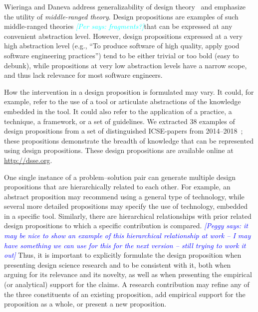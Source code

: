 \documentclass[graybox]{svmult}
\newcommand{\emelie}[1]{\textcolor{red}{{\it [Emelie says: #1]}}}
\newcommand{\peggy}[1]{\textcolor{blue}{{\it [Peggy says: #1]}}}
\newcommand{\per}[1]{\textcolor{cyan}{{\it [Per says: #1]}}}
\newcommand{\emelie}[1]{}
\newcommand{\peggy}[1]{}
\newcommand{\per}[1]{}
\begin{document}
Wieringa and Daneva address generalizability of design theory~\cite{wieringa_six_2015} and emphasize the utility of \emph{middle-ranged theory}. %
Design propositions are examples of such middle-ranged theories \per{fragments?}that can be expressed at any convenient abstraction level. However, design propositions expressed at a very high abstraction level (e.g., ``To produce software of high quality, apply good software engineering practices'') tend to be either trivial or too bold (easy to debunk), while propositions at very low abstraction levels have a narrow scope, and thus lack relevance for most software engineers. 

How the intervention in a design proposition is formulated may vary. It could, for example, refer to the use of a tool or articulate abstractions of the knowledge embedded in the tool. It could also refer to the application of a practice, a technique, a framework, or a set of guidelines. We extracted 38 examples of design propositions from a set of distinguished ICSE-papers from 2014--2018~\cite{Engstrom19arxiv}; these propositions demonstrate the breadth of knowledge that can be represented using design propositions. These design propositions are available online at \url{http://dsse.org}.

One single instance of a problem--solution pair can generate multiple design propositions that are hierarchically related to each other. For example, an abstract proposition may recommend using a general type of technology, while several more detailed propositions may specify the use of technology, embedded in a specific tool. Similarly, there are hierarchical relationships with prior related design propositions to which a specific contribution is compared.
\peggy{it may be nice to show an example of this hierarchical relationship at work -- I may have something we can use for this for the next version -- still trying to work it out}
Thus, it is important to explicitly formulate the design proposition when presenting design science research and to be consistent with it, both when arguing for its relevance and its novelty, as well as when presenting the empirical (or analytical) support for the claims. A research contribution may refine any of the three constituents of an existing proposition, add empirical support for the proposition as a whole, or present a new proposition.
\end{document}

